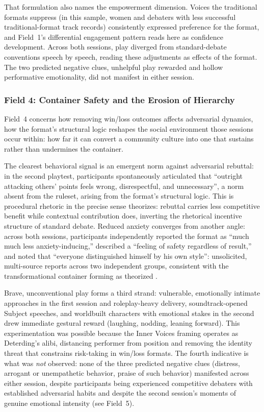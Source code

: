 That formulation also names the empowerment dimension. Voices the traditional formats suppress (in this sample, women and debaters with less successful traditional-format track records) consistently expressed preference for the format, and Field~1's differential engagement pattern reads here as confidence development. Across both sessions, play diverged from standard-debate conventions speech by speech, reading these adjustments as effects of the format. The two predicted negative clues, unhelpful play rewarded and hollow performative emotionality, did not manifest in either session.

\subsubsection{Field 4: Container Safety and the Erosion of Hierarchy}

Field~4 concerns how removing win/loss outcomes affects adversarial dynamics, how the format's structural logic reshapes the social environment those sessions occur within: how far it can convert a community culture into one that sustains rather than undermines the container.

The clearest behavioral signal is an emergent norm against adversarial rebuttal: in the second playtest, participants spontaneously articulated that ``outright attacking others' points feels wrong, disrespectful, and unnecessary'', a norm absent from the ruleset, arising from the format's structural logic. This is procedural rhetoric in the precise sense \textcite{bogost2007persuasive} theorizes: rebuttal carries less competitive benefit while contextual contribution does, inverting the rhetorical incentive structure of standard debate. Reduced anxiety converges from another angle: across both sessions, participants independently reported the format as ``much much less anxiety-inducing,'' described a ``feeling of safety regardless of result,'' and noted that ``everyone distinguished himself by his own style'': unsolicited, multi-source reports across two independent groups, consistent with the transformational container forming as theorized \parencite{bowman2021magic, bowman2025transformative}.

Brave, unconventional play forms a third strand: vulnerable, emotionally intimate approaches in the first session and roleplay-heavy delivery, soundtrack-opened Subject speeches, and worldbuilt characters with emotional stakes in the second drew immediate gestural reward (laughing, nodding, leaning forward). This experimentation was possible because the Inner Voices framing operates as Deterding's \parencite{deterding2017alibis} alibi, distancing performer from position and removing the identity threat that constrains risk-taking in win/loss formats. The fourth indicative is what was \textit{not} observed: none of the three predicted negative clues (distress, arrogant or unempathetic behavior, praise of such behavior) manifested across either session, despite participants being experienced competitive debaters with established adversarial habits and despite the second session's moments of genuine emotional intensity (see Field~5).

